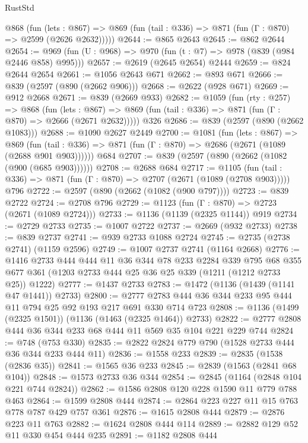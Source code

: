 \begin{lexlean}{RustStd}
\begin{coremodule}
    @868
      (fun (lets : @867) =>
      @869 (fun (tail : @336) => @871 (fun (Γ : @870) => @2599 (@2626 @2632)))))
@2644 := @865 @2643
@2645 := @862 @2644
@2654 := @969 (fun (U : @968) => @970 (fun (t : @7) => @978 (@839 (@984 @2446 @858) @995)))
@2657 := @2619 (@2645 @2654) @2444
@2659 := @824 @2644 @2654
@2661 := @1056 @2643 @671
@2662 := @893 @671
@2666 := @839 (@2597 (@890 (@2662 @906)))
@2668 := @2622 (@928 @671)
@2669 := @912 @2668
@2671 := @839 (@2669 @933)
@2682 := @1059
    (fun (rty : @257) =>
    @868
      (fun (lets : @867) =>
      @869 (fun (tail : @336) => @871 (fun (Γ : @870) => @2666 (@2671 @2632)))))
    @326
@2686 := @839 (@2597 (@890 (@2662 @1083)))
@2688 := @1090 @2627 @2449
@2700 := @1081
    (fun (lets : @867) =>
    @869 (fun (tail : @336) => @871 (fun (Γ : @870) => @2686 (@2671 (@1089 (@2688 @901 @903))))))
    @684
@2707 := @839 (@2597 (@890 (@2662 (@1082 (@900 (@685 @903))))))
@2708 := @2688 @684
@2717 := @1105
    (fun (tail : @336) => @871 (fun (Γ : @870) => @2707 (@2671 (@1089 (@2708 @903)))))
    @796
@2722 := @2597 (@890 (@2662 (@1082 (@900 @797))))
@2723 := @839 @2722
@2724 := @2708 @796
@2729 := @1123 (fun (Γ : @870) => @2723 (@2671 (@1089 @2724)))
@2733 := @1136 (@1139 (@2325 @1144)) @919
@2734 := @2729 @2733
@2735 := @1007 @2722
@2737 := @2669 (@932 @2733)
@2738 := @839 @2737
@2741 := @939 @2733 @1088 @2724
@2745 := @2735 (@2738 @2741) (@1159 @2596)
@2749 := @1007 @2737 @2741 (@1164 @2668)
@2776 := @1416
    @2733
    @444
    @444
    @11
    @36
    @344
    @78
    @233
    @2284
    @339
    @795
    @68
    @355
    @677
    @361
    (@1203 @2733 @444 @25 @36 @25 @339 (@1211 (@1212 @2733 @25)) @1222)
@2777 := @1437 @2733
@2783 := @1472 (@1136 (@1439 (@1141 @47 @1441)) @2733)
@2800 := @2777 @2783 @444 @36 @344 @233 @95 @444 @11 @794 @25 @92 @193 @217 @691 @330 @714 @723
@2808 := @1136 (@1499 (@2325 @1501)) (@1136 (@1463 (@2325 @1464)) @2733)
@2822 := @2777 @2808 @444 @36 @344 @233 @68 @444 @11 @569 @35 @104 @221 @229 @744
@2824 := @748 (@753 @330)
@2835 := @2822 @2824 @779 @790 (@1528 @2733 @444 @36 @344 @233 @444 @11)
@2836 := @1558 @233
@2839 := @2835 (@1538 (@2836 @35))
@2841 := @1565 @36 @233
@2845 := @2839 (@1563 (@2841 @68 @104))
@2848 := @1573 @2733 @36 @344
@2854 := @2845 (@1164 (@2848 @104 @221 @744 @2824))
@2862 := @1586 @2808 @120 @228 @1590 @11 @779 @788 @463
@2864 := @1599 @2808 @444
@2874 := @2864 @223 @227 @11 @15 @763 @778 @787 @429 @757 @361
@2876 := @1615 @2808 @444
@2879 := @2876 @223 @11 @763
@2882 := @1624 @2808 @444 @114
@2889 := @2882 @129 @52 @11 @330 @454 @444 @235
@2891 := @1182 @2808 @444

\end{coremodule}
\end{lexlean}
